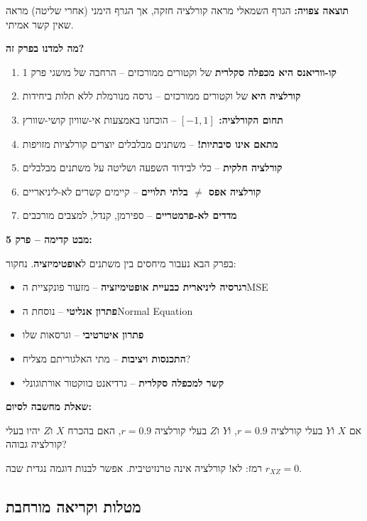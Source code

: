 \textbf{תוצאה צפויה:} הגרף השמאלי מראה קורלציה חזקה, אך הגרף הימני (אחרי שליטה) מראה שאין קשר אמיתי.


\textbf{מה למדנו בפרק זה?}

\begin{enumerate}
\item \textbf{קו-ווריאנס היא מכפלה סקלרית} של וקטורים ממורכזים – הרחבה של מושגי פרק \num{1}
\item \textbf{קורלציה היא } של וקטורים ממורכזים – גרסה מנורמלת ללא תלות ביחידות
\item \textbf{תחום הקורלציה: $[-1, 1]$} – הוכחנו באמצעות אי-שוויון קושי-שוורץ
\item \textbf{מתאם אינו סיבתיות!} – משתנים מבלבלים יוצרים קורלציות מזויפות
\item \textbf{קורלציה חלקית} – כלי לבידוד השפעה ושליטה על משתנים מבלבלים
\item \textbf{קורלציה אפס $\neq$ בלתי תלויים} – קיימים קשרים לא-ליניאריים
\item \textbf{מדדים לא-פרמטריים} – ספירמן, קנדל,  למצבים מורכבים
\end{enumerate}

\textbf{מבט קדימה – פרק \num{5}:}

בפרק הבא נעבור מיחסים בין משתנים ל\textbf{אופטימיזציה}. נחקור:

\begin{itemize}
\item \textbf{רגרסיה ליניארית כבעיית אופטימיזציה} – מזעור פונקציית ה\en{-}MSE
\item \textbf{פתרון אנליטי} – נוסחת ה\en{-}Normal Equation
\item \textbf{פתרון איטרטיבי} –  וגרסאות שלו
\item \textbf{התכנסות ויציבות} – מתי האלגוריתם מצליח?
\item \textbf{קשר למכפלה סקלרית} – גרדיאנט כווקטור אורתוגונלי
\end{itemize}

\textbf{שאלת מחשבה לסיום:}

אם $X$ ו\en{-}$Y$ בעלי קורלציה $r = 0.9$, ו\en{-}$Y$ ו\en{-}$Z$ בעלי קורלציה $r = 0.9$, האם בהכרח $X$ ו\en{-}$Z$ יהיו בעלי קורלציה גבוהה?

רמז: לא! קורלציה אינה טרנזיטיבית. אפשר לבנות דוגמה נגדית שבה $r_{XZ} = 0$.

\subsection*{מטלות וקריאה מורחבת}

